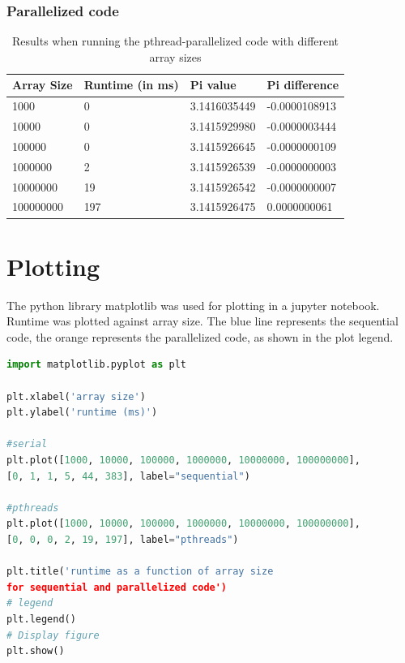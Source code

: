 \documentclass[10pt,a4paper]{article} %
\begin{document}
\subsubsection{Parallelized code}

\begin{table}[h]
\begin{center}
\begin{tabular}{|l||l|l|l|}
\hline
Array Size & Runtime (in ms) & Pi value & Pi difference\\
\hline
1000 & 0 & 3.1416035449 & -0.0000108913 \\
10000 & 0 & 3.1415929980 & -0.0000003444 \\
100000 & 0 & 3.1415926645 & -0.0000000109 \\
1000000 & 2 & 3.1415926539 & -0.0000000003 \\
10000000 & 19 & 3.1415926542 & -0.0000000007 \\
100000000 & 197 & 3.1415926475 & 0.0000000061 \\
\hline
\end{tabular}
\end{center}
\caption{Results when running the pthread-parallelized code with different array sizes}
\end{table}


\section{Plotting}

The python library matplotlib was used for plotting in a jupyter notebook. Runtime was plotted against array size. The blue line represents the sequential code, the orange represents the parallelized code, as shown in the plot legend.

\begin{lstlisting}[language=Python, caption=Plotting]
import matplotlib.pyplot as plt

plt.xlabel('array size')
plt.ylabel('runtime (ms)')

#serial
plt.plot([1000, 10000, 100000, 1000000, 10000000, 100000000], 
[0, 1, 1, 5, 44, 383], label="sequential")

#pthreads
plt.plot([1000, 10000, 100000, 1000000, 10000000, 100000000], 
[0, 0, 0, 2, 19, 197], label="pthreads")

plt.title('runtime as a function of array size 
for sequential and parallelized code')
# legend
plt.legend()
# Display figure
plt.show()

\end{lstlisting}
\end{document}
